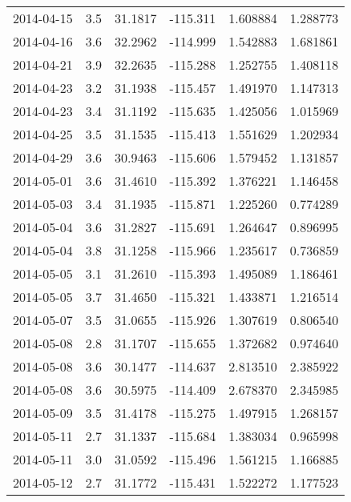 \begin{tabular}{lrrrrr}
2014-04-15 &       3.5 &  31.1817 &  -115.311 &         1.608884 &         1.288773 \\
2014-04-16 &       3.6 &  32.2962 &  -114.999 &         1.542883 &         1.681861 \\
2014-04-21 &       3.9 &  32.2635 &  -115.288 &         1.252755 &         1.408118 \\
2014-04-23 &       3.2 &  31.1938 &  -115.457 &         1.491970 &         1.147313 \\
2014-04-23 &       3.4 &  31.1192 &  -115.635 &         1.425056 &         1.015969 \\
2014-04-25 &       3.5 &  31.1535 &  -115.413 &         1.551629 &         1.202934 \\
2014-04-29 &       3.6 &  30.9463 &  -115.606 &         1.579452 &         1.131857 \\
2014-05-01 &       3.6 &  31.4610 &  -115.392 &         1.376221 &         1.146458 \\
2014-05-03 &       3.4 &  31.1935 &  -115.871 &         1.225260 &         0.774289 \\
2014-05-04 &       3.6 &  31.2827 &  -115.691 &         1.264647 &         0.896995 \\
2014-05-04 &       3.8 &  31.1258 &  -115.966 &         1.235617 &         0.736859 \\
2014-05-05 &       3.1 &  31.2610 &  -115.393 &         1.495089 &         1.186461 \\
2014-05-05 &       3.7 &  31.4650 &  -115.321 &         1.433871 &         1.216514 \\
2014-05-07 &       3.5 &  31.0655 &  -115.926 &         1.307619 &         0.806540 \\
2014-05-08 &       2.8 &  31.1707 &  -115.655 &         1.372682 &         0.974640 \\
2014-05-08 &       3.6 &  30.1477 &  -114.637 &         2.813510 &         2.385922 \\
2014-05-08 &       3.6 &  30.5975 &  -114.409 &         2.678370 &         2.345985 \\
2014-05-09 &       3.5 &  31.4178 &  -115.275 &         1.497915 &         1.268157 \\
2014-05-11 &       2.7 &  31.1337 &  -115.684 &         1.383034 &         0.965998 \\
2014-05-11 &       3.0 &  31.0592 &  -115.496 &         1.561215 &         1.166885 \\
2014-05-12 &       2.7 &  31.1772 &  -115.431 &         1.522272 &         1.177523 \\

\end{tabular}
